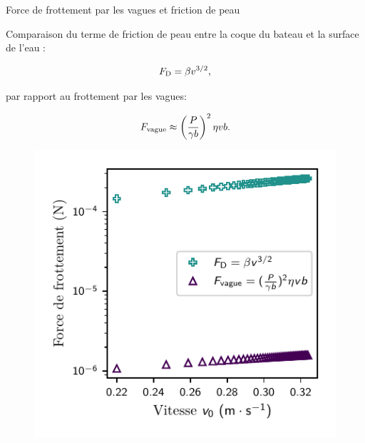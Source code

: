 \documentclass[aspectratio=169,10pt]{beamer}
\begin{document}
\begin{frame}{Force de frottement par les vagues et friction de peau}
    \begin{minipage}{5cm}
        Comparaison du terme de friction de peau entre la coque du bateau et la surface de l'eau : 

        \[F_{\rm D} = \beta v^{3/2},\]

        par rapport au frottement par les vagues:

        \[F_{\rm vague}\approx\left(\frac{P}{\gamma b}\right)^{2}\eta v b.\]
        
    \end{minipage}
    \begin{minipage}{8cm}
            \begin{figure}[!ht]
            \centering
            \includegraphics[scale=1]{./figures/Forces_de_friction.pdf}
        \end{figure}
    \end{minipage}
\end{frame}
\end{document}
